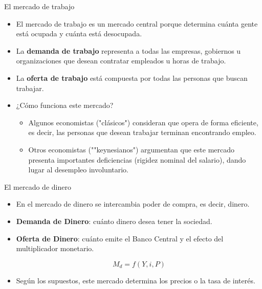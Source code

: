 \documentclass{beamer}
\begin{document}
\begin{frame}{El mercado de trabajo}
\begin{itemize}
    \item El mercado de trabajo es un mercado central porque determina cuánta gente está ocupada y cuánta está desocupada. \vspace{2mm}
    \item La \textbf{demanda de trabajo} representa a todas las empresas, gobiernos u organizaciones que desean contratar empleados u horas de trabajo. \vspace{2mm} 
    \item La \textbf{oferta de trabajo} está compuesta por todas las personas que buscan trabajar. \vspace{2mm}
    \item ¿Cómo funciona este mercado?
    \begin{itemize}
        \item Algunos economistas ("clásicos") consideran que opera de forma eficiente, es decir, las personas que desean trabajar terminan encontrando empleo.
        \item Otros economistas (""keynesianos") argumentan que este mercado presenta importantes deficiencias (rigidez nominal del salario), dando lugar al desempleo involuntario.
    \end{itemize}
\end{itemize}
\end{frame}


\begin{frame}{El mercado de dinero}
\begin{itemize}
    \item En el mercado de dinero se intercambia  poder de compra, es decir, dinero.  \vspace{2mm}
    \item \textbf{Demanda de Dinero}: cuánto dinero desea tener la sociedad. \vspace{2mm}
     \item \textbf{Oferta de Dinero}: cuánto emite el Banco Central y el efecto del multiplicador monetario.  
            \begin{center}

            \begin{tcolorbox}[width=2in, boxsep=0pt, left=0pt, right=0pt, top=2pt,colframe = blue!70!black, colback = blue!7!white]%
                    $$ M_{d}=f(Y, i, P) $$
             \end{tcolorbox}
             
             \end{center}  \vspace{2mm}
    \item Según los supuestos, este mercado determina los precios o la tasa de interés. 
\end{itemize}
\end{frame}
\end{document}
